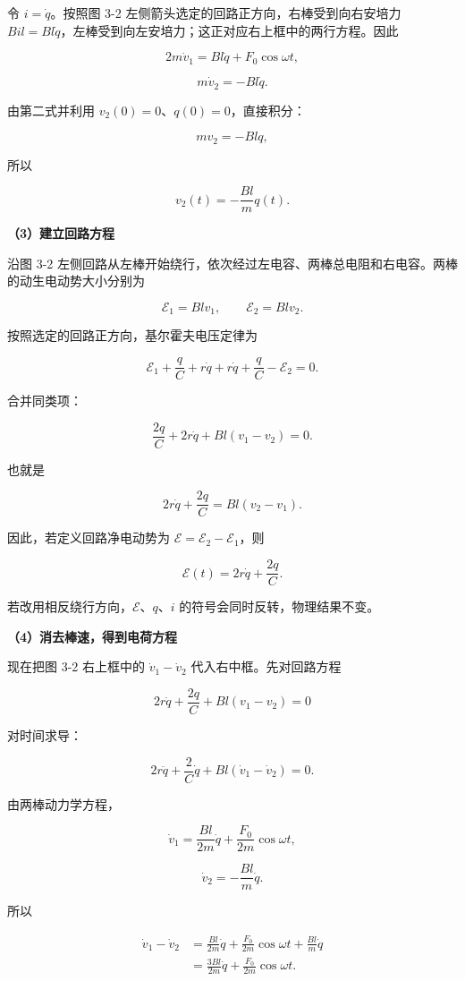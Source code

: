 \documentclass[12pt,a4paper,UTF8]{ctexart}
\begin{document}
令 \(i=\dot q\)。按照图 3-2 左侧箭头选定的回路正方向，右棒受到向右安培力
\(Bil=Bl\dot q\)，左棒受到向左安培力；这正对应右上框中的两行方程。因此

\[
\boxed{2m\dot v_1=Bl\dot q+F_0\cos\omega t},
\]

\[
\boxed{m\dot v_2=-Bl\dot q}.
\]

由第二式并利用 \(v_2(0)=0\)、\(q(0)=0\)，直接积分：

\[
mv_2=-Blq,
\]

所以

\[
\boxed{v_2(t)=-\frac{Bl}{m}q(t)}.
\]

\textbf{（3）建立回路方程}

沿图 3-2
左侧回路从左棒开始绕行，依次经过左电容、两棒总电阻和右电容。两棒的动生电动势大小分别为

\[
\mathcal E_1=Blv_1,
\qquad
\mathcal E_2=Blv_2.
\]

按照选定的回路正方向，基尔霍夫电压定律为

\[
\mathcal E_1+\frac qC+r\dot q+r\dot q+\frac qC-\mathcal E_2=0.
\]

合并同类项：

\[
\frac{2q}{C}+2r\dot q+Bl(v_1-v_2)=0.
\]

也就是

\[
\boxed{2r\dot q+\frac{2q}{C}=Bl(v_2-v_1)}.
\]

因此，若定义回路净电动势为 \(\mathcal E=\mathcal E_2-\mathcal E_1\)，则

\[
\boxed{\mathcal E(t)=2r\dot q+\frac{2q}{C}}.
\]

若改用相反绕行方向，\(\mathcal E\)、\(q\)、\(i\)
的符号会同时反转，物理结果不变。

\textbf{（4）消去棒速，得到电荷方程}

现在把图 3-2 右上框中的 \(\dot v_1-\dot v_2\) 代入右中框。先对回路方程

\[
2r\dot q+\frac{2q}{C}+Bl(v_1-v_2)=0
\]

对时间求导：

\[
2r\ddot q+\frac{2}{C}\dot q+Bl(\dot v_1-\dot v_2)=0.
\]

由两棒动力学方程，

\[
\dot v_1=\frac{Bl}{2m}\dot q+\frac{F_0}{2m}\cos\omega t,
\]

\[
\dot v_2=-\frac{Bl}{m}\dot q.
\]

所以

\[
\begin{aligned}
\dot v_1-\dot v_2
&=\frac{Bl}{2m}\dot q+\frac{F_0}{2m}\cos\omega t
+\frac{Bl}{m}\dot q\\
&=\frac{3Bl}{2m}\dot q+\frac{F_0}{2m}\cos\omega t.
\end{aligned}
\]
\end{document}
